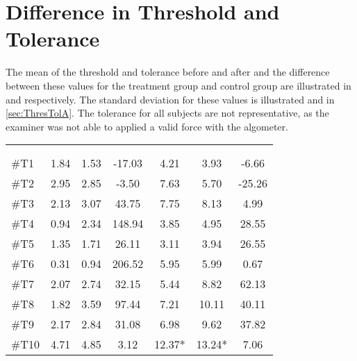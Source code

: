 \section{Difference in Threshold and Tolerance}
The mean of the threshold and tolerance before and after and the difference between these values for the treatment group and control group are illustrated in   and  respectively. The standard deviation for these values is illustrated  and  in \autoref{sec:ThresTolA}. The tolerance for all subjects are not representative, as the examiner was not able to applied a valid force with the algometer. 

\begin{longtable} {l|c|c|c|c|c|c}
 \rowcolor[HTML]{C0C0C0} 
  \color[HTML]{000000}{} & 
 \multicolumn{3}{c|}{ \color[HTML]{000000}{\textbf{Threshold}}} & \multicolumn{3}{c}{ \color[HTML]{000000}{\textbf{Tolerance}}}  	\\  \rule{0pt}{3ex} 
  \cellcolor[HTML]{C0C0C0}{} &
 \multicolumn{1}{c|}{ \cellcolor[HTML]{C0C0C0}{Pre [KgF]}} & \multicolumn{1}{c|}{ \cellcolor[HTML]{C0C0C0}{Post [KgF]}} 
 & \multicolumn{1}{c}{ \cellcolor[HTML]{C0C0C0}{\textcolor[HTML]{C0C0C0}{0}Diff [\%]\textcolor[HTML]{C0C0C0}{0}}}
 & \multicolumn{1}{|c|}{ \cellcolor[HTML]{C0C0C0}{Pre [KgF]}} 
 & \multicolumn{1}{c|}{ \cellcolor[HTML]{C0C0C0}{Post [KgF]}} 
 & \multicolumn{1}{c}{ \cellcolor[HTML]{C0C0C0}{\textcolor[HTML]{C0C0C0}{0}Diff [\%]\textcolor[HTML]{C0C0C0}{0}}}  	\\ \hline 
\#T1 & 1.84 & 1.53 & -17.03 & 4.21 & 3.93 & -6.66 \\ \hline
\#T2 & 2.95 & 2.85  & -3.50 & 7.63  & 5.70 & -25.26 \\ \hline
\#T3 & 2.13 & 3.07 & 43.75 & 7.75 & 8.13 & 4.99 \\ \hline
\#T4 & 0.94 & 2.34  & 148.94  & 3.85 & 4.95 & 28.55 \\ \hline
\#T5 & 1.35 & 1.71  & 26.11 & 3.11 & 3.94 & 26.55 \\ \hline	
\#T6 & 0.31 & 0.94   & 206.52 & 5.95 & 5.99 & 0.67 \\ \hline
\#T7 & 2.07 & 2.74  & 32.15 & 5.44 & 8.82 & 62.13 \\ \hline
\#T8 & 1.82 & 3.59 & 97.44 & 7.21 & 10.11 & 40.11 \\ \hline
\#T9 & 2.17 & 2.84  & 31.08 & 6.98 & 9.62 & 37.82 \\ \hline
\#T10 & 4.71 & 4.85  & 3.12 & 12.37*  & 13.24* & 7.06 \\ \hline

\end{longtable}
